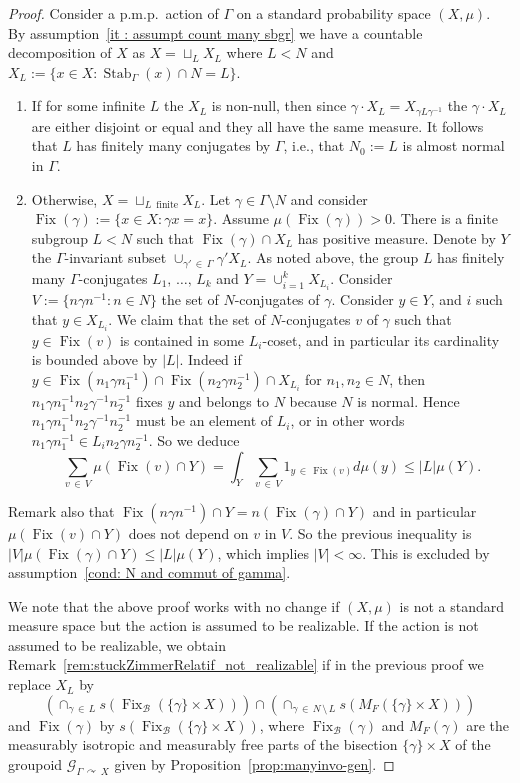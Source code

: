 \documentclass[10pt]{amsart}
\theoremstyle{definition}
\newcommand{\acting}{\curvearrowright}
\newcommand{\cg}{\mathcal{G}}
\newcommand{\rb}{\mathscr{B}}
\DeclareMathOperator{\Fix}{Fix}
\DeclareMathOperator{\Stab}{Stab}
\newcommand{\pmp}{p.m.p.\ }
\newcommand*{\romanenumi}{\renewcommand*{\theenumi}{\roman{enumi}}}
\begin{document}
\begin{proof}
Consider a \pmp action of $\Gamma$ on a standard probability space $(X,\mu)$. By assumption~\eqref{it : assumpt count many sbgr} we have a countable decomposition of $X$ as $X= \sqcup_{L} X_L$ where $L<N$ and $X_L:=\{x\in X: \Stab_{\Gamma}(x)\cap N=L\}$.
\begin{enumerate}\romanenumi
\item If for some infinite $L$ the $X_{L}$ is non-null, then since $\gamma\cdot X_L=X_{\gamma L \gamma^{-1}}$ the $\gamma\cdot X_L$ are either disjoint or equal and they all have the same measure. It follows that $L$ has finitely many conjugates by $\Gamma$, i.e., that $N_0:=L$ is almost normal in $\Gamma$.
\item Otherwise, $X = \sqcup_{L\,\text{ finite}} X_L$. Let $\gamma\in \Gamma\setminus N$ and consider $\Fix(\gamma):=\{x\in X: \gamma x=x\}$. Assume $\mu(\Fix(\gamma))>0$. There is a finite subgroup $L<N$ such that $\Fix(\gamma) \cap X_L$ has positive measure. Denote by $Y$ the $\Gamma$-invariant subset $\cup_{\gamma'\,\in\,\Gamma} \gamma' X_L$. As noted above, the group $L$ has finitely many $\Gamma$-conjugates $L_1,\,\dots,\,L_k$ and $Y=\cup_{i=1}^k X_{L_i}$. Consider $V := \{ n \gamma n^{-1} : n \in N\}$ the set of $N$-conjugates of $\gamma$. Consider $y \in Y$, and $i$ such that $y \in X_{L_i}$. We claim that the set of $N$-conjugates $v$ of $\gamma$ such that $y\in \Fix(v)$ is contained in some $L_i$-coset, and in particular its cardinality is bounded above by $|L|$. Indeed if $y\in \Fix(n_1 \gamma n_1^{-1})\cap \Fix(n_2 \gamma n_2^{-1})\cap X_{L_i}$ for $n_1,n_2 \in N$, then $n_1\gamma n_1^{-1}n_2\gamma^{-1}n_2^{-1}$ fixes $y$ and belongs to $N$ because $N$ is normal. Hence $n_1\gamma n_1^{-1}n_2\gamma^{-1}n_2^{-1}$ must be an element of $L_i$, or in other words $n_1\gamma n_1^{-1} \in L_i n_2\gamma n_2^{-1}$. So we deduce
\[
\sum_{v\,\in\,V} \mu\left(\Fix(v) \cap Y\right) = \int_Y \sum_{v\,\in\,V} 1_{y\,\in\,\Fix(v)} d\mu(y) \leq |L| \mu(Y).
\]
\end{enumerate}
Remark also that $\Fix(n\gamma n^{-1}) \cap Y=n(\Fix(\gamma) \cap Y)$ and in particular $\mu(\Fix(v)\cap Y)$ does not depend on $v$ in $V$. So the previous inequality is $|V| \mu(\Fix(\gamma) \cap Y) \leq |L| \mu(Y)$, which implies $|V|<\infty$. This is excluded by assumption~\eqref{cond: N and commut of gamma}.

We note that the above proof works with no change if $(X,\mu)$ is not a standard measure space but the action is assumed to be realizable. If the action is not assumed to be realizable, we obtain Remark~\ref{rem:stuckZimmerRelatif_not_realizable} if in the previous proof we replace $X_L$ by
\[
\left(\cap_{\gamma\,\in\,L} s\left(\Fix_{\rb}\left(\{\gamma\} \times X\right)\right)\right) \cap \left(\cap_{\gamma\,\in\,N\,\setminus\,L} s\left(M_F\left(\{\gamma\} \times X\right)\right)\right)
\]
and $\Fix(\gamma)$ by $s(\Fix_{\rb}(\{\gamma\}\times X))$, where $\Fix_{\rb}(\gamma)$ and $M_F(\gamma)$ are the measurably isotropic and measurably free parts of the bisection $\{\gamma\} \times X$ of the groupoid $\cg_{\Gamma\, \acting\,X}$ given by Proposition~\ref{prop:manyinvo-gen}.



\end{proof}
\end{document}
